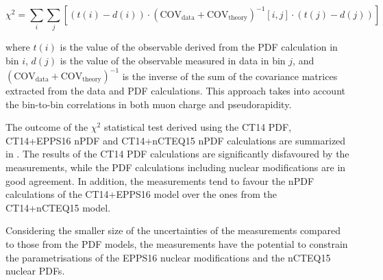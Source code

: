 \begin{equation}
 \chi^{2} = \sum_{i}\sum_{j}\left[\left(t(i) - d(i)\right)\cdot\left(\text{COV}_{\text{data}} + \text{COV}_{\text{theory}}\right)^{-1}\left[i , j\right]\cdot\left(t(j) - d(j)\right)\right]
 \label{eq:Chi2Test}
\end{equation}

where $t(i)$ is the value of the observable derived from the PDF calculation in bin $i$, $d(j)$ is the value of the observable measured in data in bin $j$, and $\left(\text{COV}_{\text{data}} + \text{COV}_{\text{theory}}\right)^{-1}$ is the inverse of the sum of the covariance matrices extracted from the data and PDF calculations. This approach takes into account the bin-to-bin correlations in both muon charge and pseudorapidity.

The outcome of the $\chi^{2}$ statistical test derived using the CT14 PDF, CT14+EPPS16 nPDF and CT14+nCTEQ15 nPDF calculations are summarized in . The results of the CT14 PDF calculations are significantly disfavoured by the measurements, while the PDF calculations including nuclear modifications are in good agreement. In addition, the measurements tend to favour the nPDF calculations of the CT14+EPPS16 model over the ones from the CT14+nCTEQ15 model.



Considering the smaller size of the uncertainties of the measurements compared to those from the PDF models, the measurements have the potential to constrain the parametrisations of the EPPS16 nuclear modifications and the nCTEQ15 nuclear PDFs.


